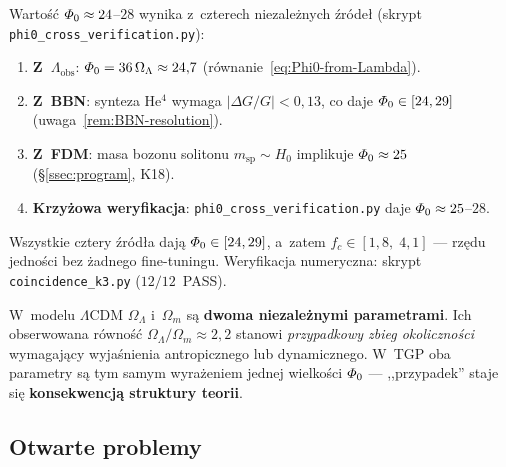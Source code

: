 \begin{remark}%
  \label{rem:phi0-four-constraints}
Warto\'s\'c $\varPhi_0 \approx 24$--$28$ wynika z~czterech
niezale\.znych \'zr\'ode\l{} (skrypt
\texttt{phi0\_cross\_verification.py}):
\begin{enumerate}[nosep]
  \item \textbf{Z~$\Lambda_{\mathrm{obs}}$}:
        $\varPhi_0 = 36\,\Omega_\Lambda \approx 24{,}7$
        (r\'ownanie~\ref{eq:Phi0-from-Lambda}).
  \item \textbf{Z~BBN}: synteza He$^4$ wymaga
        $|\Delta G/G| < 0{,}13$, co daje $\varPhi_0 \in [24, 29]$
        (uwaga~\ref{rem:BBN-resolution}).
  \item \textbf{Z~FDM}: masa bozonu solitonu
        $m_{\mathrm{sp}} \sim H_0$
        implikuje $\varPhi_0 \approx 25$
        (\S\ref{ssec:program}, K18).
  \item \textbf{Krzy\.zowa weryfikacja}:
        \texttt{phi0\_cross\_verification.py}
        daje $\varPhi_0 \approx 25$--$28$.
\end{enumerate}
Wszystkie cztery \'zr\'od\l{}a daj\k{a} $\varPhi_0 \in [24, 29]$,
a~zatem $f_c \in [1{,}8,\;4{,}1]$ --- rz\k{e}du jedno\'sci bez
\.zadnego fine-tuningu.
Weryfikacja numeryczna: skrypt \texttt{coincidence\_k3.py}
($12/12$~PASS).
\end{remark}

\begin{remark}\label{rem:k3-vs-lcdm}
W~modelu $\Lambda$CDM $\Omega_\Lambda$ i~$\Omega_m$ s\k{a}
\textbf{dwoma niezale\.znymi parametrami}.
Ich obserwowana r\'owno\'s\'c $\Omega_\Lambda/\Omega_m
\approx 2{,}2$ stanowi \emph{przypadkowy zbieg okoliczno\'sci}
wymagaj\k{a}cy wyja\'snienia antropicznego lub dynamicznego.
W~TGP oba parametry s\k{a} tym samym wyra\.zeniem jednej
wielko\'sci $\varPhi_0$ --- ,,przypadek'' staje si\k{e}
\textbf{konsekwencj\k{a} struktury teorii}.
\end{remark}

\subsection{Otwarte problemy}\label{ssec:de-prob}

